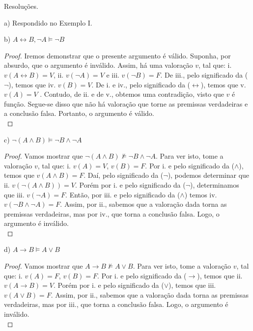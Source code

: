 \documentclass[12pt]{exam}
\begin{document}
\pagebreak

Resoluções.\\ 

\bigskip

a) Respondido no Exemplo I.\\

\bigskip

b) $A \leftrightarrow B, \neg A \vDash \neg B$
\begin{proof}
Iremos demonstrar que o presente argumento é válido. Suponha, por absurdo, que o argumento é inválido. Assim, há uma valoração $v$, tal que:
i. $v(A \leftrightarrow B)=V$, 
ii. $v(\neg A)=V$ e 
iii. $v(\neg B)=F$. De iii., pelo significado da ($\neg$), temos que iv. $v(B)=V$. De i. e iv., pelo significado da ($\leftrightarrow$), temos que v. $v(A)=V$ . Contudo, de ii. e de v., obtemos uma contradição, visto que $v$ é função. Segue-se disso que não há valoração que torne as premissas verdadeiras e a conclusão falsa. Portanto, o argumento é válido.\\
\end{proof}

\bigskip

c) $\neg \left( A\land B \right)\vDash \neg B\land \neg A$

\begin{proof}
Vamos mostrar que $\neg \left( A\land B \right)\nvDash \neg B\land \neg A$. Para ver isto, tome a valoração $v$, tal que: i. $v(A)=V$, $v(B)=F$. Por i. e pelo significado da ($\land$), temos que $v(A\land B)=F$. Daí, pelo significado da ($\neg$), podemos determinar que ii. $v(\neg \left( A\land B \right))=V$. Porém por i. e pelo significado da ($\neg$), determinamos que iii. $v(\neg A)=F$. Então, por iii. e pelo significado da ($\land$) temos iv. $v(\neg B\land \neg A)=F$. Assim, por ii., sabemos que a valoração dada torna as premissas verdadeiras, mas por iv., que torna a conclusão falsa. Logo, o argumento é inválido.\\
\end{proof}

\bigskip

d) $A\rightarrow B\vDash A\lor B$

\begin{proof}
Vamos mostrar que $A\rightarrow B\nvDash A\lor B$. Para ver isto, tome a valoração $v$, tal que: i. $v(A)=F$, $v(B)=F$. Por i. e pelo significado da ($\rightarrow$), temos que ii. $v(A\rightarrow B)=V$. Porém por i. e pelo significado da ($\lor$), temos que iii. $v(A\lor B)=F$. Assim, por ii., sabemos que a valoração dada torna as premissas verdadeiras, mas por iii., que torna a conclusão falsa. Logo, o argumento é inválido.\\
\end{proof}
\end{document}
